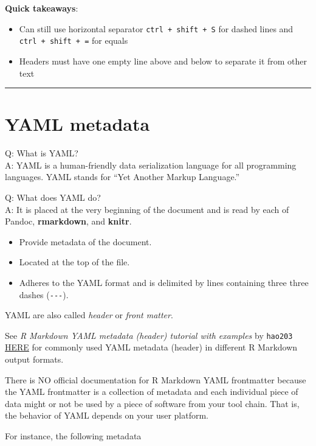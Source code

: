 \documentclass[
  a4paper,
  twoside,
  openright]{book}
\providecommand{\tightlist}{%
  \setlength{\itemsep}{0pt}\setlength{\parskip}{0pt}}
\theoremstyle{definition}
\theoremstyle{definition}
\theoremstyle{definition}
\theoremstyle{definition}
\theoremstyle{remark}
\begin{document}
\textbf{Quick takeaways}:

\begin{itemize}
\tightlist
\item
  Can still use horizontal separator \texttt{ctrl\ +\ shift\ +\ S} for dashed lines and \texttt{ctrl\ +\ shift\ +\ =} for equals
\item
  Headers must have one empty line above and below to separate it from other text
\end{itemize}

\begin{center}\rule{0.5\linewidth}{0.5pt}\end{center}

\section{YAML metadata}\label{yaml-metadata}

Q: What is YAML?\\
A: YAML is a human-friendly data serialization language for all programming languages. YAML stands for ``Yet Another Markup Language.''

Q: What does YAML do?\\
A: It is placed at the very beginning of the document and is read by each of Pandoc, \textbf{rmarkdown}, and \textbf{knitr}.

\begin{itemize}
\tightlist
\item
  Provide metadata of the document.
\item
  Located at the top of the file.
\item
  Adheres to the YAML format and is delimited by lines containing three three dashes (\texttt{-\/-\/-}).
\end{itemize}

YAML are also called \emph{header} or \emph{front matter}.

See \emph{R Markdown YAML metadata (header) tutorial with examples} by \texttt{hao203} \href{https://github.com/hao203/rmarkdown-YAML.git}{HERE} for commonly used YAML metadata (header) in different R Markdown output formats.

There is NO official documentation for R Markdown YAML frontmatter because the YAML frontmatter is a collection of metadata and each individual piece of data might or not be used by a piece of software from your tool chain. That is, the behavior of YAML depends on your user platform.

For instance, the following metadata
\end{document}
